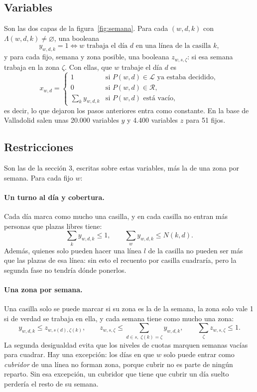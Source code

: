 \documentclass[11pt,a4paper]{article}
\newcommand{\Lin}{\mathcal{L}}
\newcommand{\Desc}{\mathcal{R}}
\begin{document}
\subsection{Variables}

Son las dos capas de la figura~\ref{fig:semana}. Para cada $(w,d,k)$ con
$\Lambda(w,d,k) \neq \varnothing$, una booleana
\[
  y_{w,d,k} = 1 \iff w \text{ trabaja el día } d \text{ en una línea de la casilla } k,
\]
y para cada fijo, semana y zona posible, una booleana $z_{w,s,\zeta}$: si esa semana trabaja en
la zona $\zeta$. Con ellas, que $w$ trabaje el día $d$ es
\[
  x_{w,d} =
  \begin{cases}
    1 & \text{si } P(w,d) \in \Lin \text{ ya estaba decidido},\\
    0 & \text{si } P(w,d) \in \Desc,\\
    \sum_k y_{w,d,k} & \text{si } P(w,d) \text{ está vacío,}
  \end{cases}
\]
es decir, lo que dejaron los pasos anteriores entra como constante. En la base de Valladolid
salen unas 20.000 variables $y$ y 4.400 variables $z$ para 51 fijos.

\subsection{Restricciones}

Son las de la sección 3, escritas sobre estas variables, más la de una zona por semana. Para
cada fijo $w$:

\paragraph{Un turno al día y cobertura.} Cada día marca como mucho una casilla, y en cada casilla
no entran más personas que plazas libres tiene:
\[
  \sum_k y_{w,d,k} \le 1,
  \qquad
  \sum_w y_{w,d,k} \le N(k,d).
\]
Además, quienes solo pueden hacer una línea $l$ de la casilla no pueden ser más que las plazas de
esa línea: sin esto el recuento por casilla cuadraría, pero la segunda fase no tendría dónde
ponerlos.

\paragraph{Una zona por semana.} Una casilla solo se puede marcar si su zona es la de la semana,
la zona solo vale 1 si de verdad se trabaja en ella, y cada semana tiene como mucho una zona:
\[
  y_{w,d,k} \le z_{w,s(d),\zeta(k)}, \qquad
  z_{w,s,\zeta} \le \sum_{d \in s,\; \zeta(k) = \zeta} y_{w,d,k}, \qquad
  \sum_\zeta z_{w,s,\zeta} \le 1.
\]
La segunda desigualdad evita que los niveles de cuotas marquen semanas vacías para cuadrar. Hay
una excepción: los días en que $w$ solo puede entrar como \emph{cubridor} de una línea no forman
zona, porque cubrir no es parte de ningún reparto. Sin esa excepción, un cubridor que tiene que
cubrir un día suelto perdería el resto de su semana.
\end{document}
